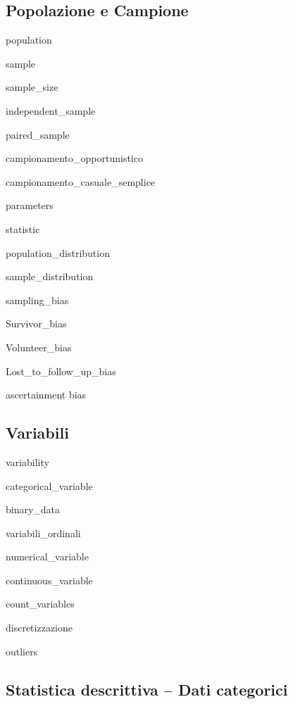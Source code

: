 \documentclass{report}
\begin{document}
\subsection*{Popolazione e Campione}

\noindent \gls{population}

\noindent \gls{sample}

\noindent \gls{sample_size}

\noindent \gls{independent_sample}

\noindent \gls{paired_sample}

\noindent \gls{campionamento_opportunistico}

\noindent \gls{campionamento_casuale_semplice}

\noindent \gls{parameters}

\noindent \gls{statistic}

\noindent \gls{population_distribution}

\noindent \gls{sample_distribution}

\noindent \gls{sampling_bias}

\noindent \gls{Survivor_bias}

\noindent \gls{Volunteer_bias}

\noindent \gls{Lost_to_follow_up_bias}

\noindent \gls{ascertainment bias}




\subsection*{Variabili}

\noindent \gls{variability}

\noindent \gls{categorical_variable}

\noindent \gls{binary_data}

\noindent \gls{variabili_ordinali}

\noindent \gls{numerical_variable}

\noindent \gls{continuous_variable}

\noindent \gls{count_variables}

\noindent \gls{discretizzazione}

\noindent \gls{outliers}



\subsection*{Statistica descrittiva -- Dati categorici}
\end{document}
